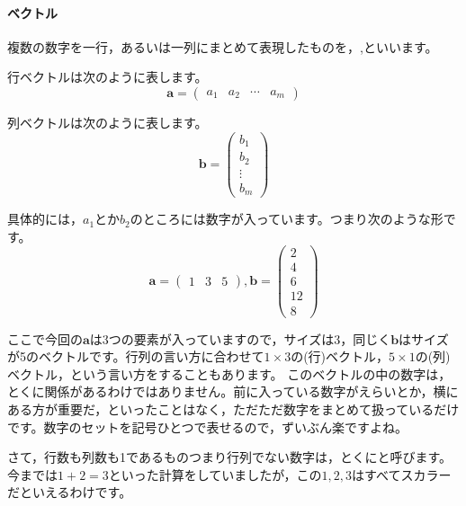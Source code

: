 \documentclass{ltjsbook}
\begin{document}
\paragraph{ベクトル}
複数の数字を一行，あるいは一列にまとめて表現したものを，,といいます。

行ベクトルは次のように表します。
\begin{equation*}
    \bm{a}=
    \begin{pmatrix}
        a_1 & a_2 & \cdots & a_m
    \end{pmatrix}
\end{equation*}

列ベクトルは次のように表します。
\begin{equation*}
    \bm{b}=
    \begin{pmatrix}
        b_1 \\ b_2\\ \vdots \\ b_m
    \end{pmatrix}
\end{equation*}

具体的には，$a_1$とか$b_2$のところには数字が入っています。つまり次のような形です。
\begin{equation*}
    \bm{a}=
    \begin{pmatrix}
        1 & 3 & 5
    \end{pmatrix},
    \bm{b}=
    \begin{pmatrix}
        2 \\ 4\\ 6\\ 12 \\ 8
    \end{pmatrix}
\end{equation*}

ここで今回の$\bm{a}$は3つの要素が入っていますので，サイズは3，同じく$\bm{b}$はサイズが5のベクトルです。行列の言い方に合わせて$1 \times 3$の(行)ベクトル，$5 \times 1$の(列)ベクトル，という言い方をすることもあります。
このベクトルの中の数字は，とくに関係があるわけではありません。前に入っている数字がえらいとか，横にある方が重要だ，といったことはなく，ただただ数字をまとめて扱っているだけです。数字のセットを記号ひとつで表せるので，ずいぶん楽ですよね。

さて，行数も列数も1であるものつまり行列でない数字は，とくにと呼びます。今までは$1+2=3$といった計算をしていましたが，この$1,2,3$はすべてスカラーだといえるわけです。
\end{document}
